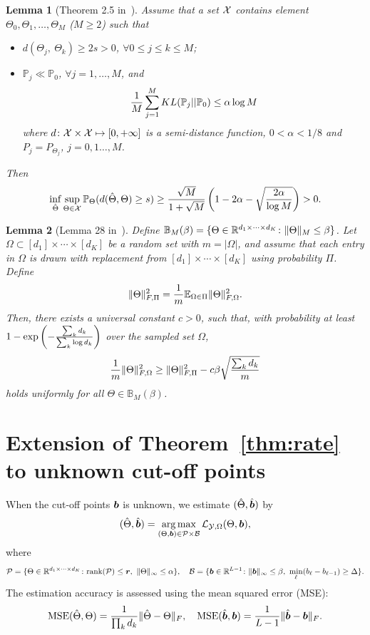 \documentclass[11pt]{article}
\theoremstyle{plain}
\newtheorem{lem}{Lemma}
\theoremstyle{definition}
\begin{document}
\begin{lem}[Theorem 2.5 in~\cite{tsybakov2009introduction}]\label{lem:Tsybakov}
Assume that a set $\mathcal{X}$ contains element $\Theta_0, \Theta_1, \ldots,\Theta_M$ ($M\geq 2$) such that
\begin{itemize}
\item $d(\Theta_j,\ \Theta_k)\geq 2s>0$, $\forall 0\leq j\leq k\leq M$;
\item $\mathbb{P}_j\ll\mathbb{P}_0$, $\forall j=1,\ldots,M$, and
\[
{1\over M}\sum_{j=1}^M KL(\mathbb{P}_j||\mathbb{P}_0)\leq \alpha \log M
\]
where $d\colon \mathcal{X}\times \mathcal{X}\mapsto [0,+\infty]$ is a semi-distance function, $0<\alpha<{1/8}$ and $P_j=P_{\Theta_j}$, $j=0,1\ldots,M$.
\end{itemize}
Then
\[
\inf_{\hat \Theta}\sup_{\Theta\in\mathcal{X}} \mathbb{P}_{\Theta}(d(\hat \Theta, \Theta)\geq s)\geq {\sqrt{M}\over 1+\sqrt{M}}\left(1-2\alpha-\sqrt{2\alpha\over \log M} \right)>0.
\]
\end{lem}

\begin{lem}[Lemma 28 in~\cite{ghadermarzy2019near}]\label{lem:convexity}
Define $\mathbb{B}_{M}(\beta)=\{\Theta\in \mathbb{R}^{d_1\times \cdots \times d_K}\colon \lVert\Theta\rVert_M\leq \beta \}$.  Let $\Omega\subset[d_1]\times\cdots \times [d_K]$ be a random set with $m=|\Omega|$, and assume that each entry in $\Omega$ is drawn with replacement from $[d_1]\times\cdots\times[d_K]$ using probability $\Pi$. Define
\[
\lVert\Theta\rVert_{F,\Pi}^2={1\over m}\mathbb{E}_{\Omega\in\Pi}\lVert\Theta\rVert_{F,\Omega}^2.
\]
Then, there exists a universal constant $c>0$, such that, with probability at least $1-\exp\left(-{\sum_kd_k \over \sum_k \log d_k} \right)$ over the sampled set $\Omega$,
\[
{1\over m}\lVert\Theta\rVert_{F,\Omega}^2 \geq \lVert\Theta\rVert_{F,\Pi}^2-c\beta\sqrt{\sum_k d_k\over m}
\]
holds uniformly for all $\Theta\in\mathbb{B}_M(\beta)$.
\end{lem}


\section{Extension of Theorem~\ref{thm:rate} to unknown cut-off points}



When the cut-off points $\bm{b}$ is unknown, we estimate $(\hat \Theta,\hat {\bm{b}})$ by
\begin{equation}\label{eq:joint}
(\hat \Theta,\hat {\bm{b}})=\operatorname*{arg\,max}_{(\Theta,\bm{b})\in\mathcal{P}\times \mathcal{B}}\mathcal{L}_{\mathcal{Y},\Omega}(\Theta,\bm{b}),
\end{equation}
where 
\[
\tP=\{\Theta\in\mathbb{R}^{d_1\times \cdots\times d_K}\colon \text{rank}(\tP)\leq \mr,\ \mnormSize{}{\Theta}\leq \alpha\}, \quad \tB=\{\mb\in\mathbb{R}^{L-1}\colon \mnormSize{}{\mb}\leq \beta,\ \min_{\ell}(b_\ell-b_{\ell-1}) \geq \Delta\}.
\]
The estimation accuracy is assessed using the mean squared error (MSE):
\[
\text{MSE}(\hat \Theta,\Theta)={1\over \prod_k d_k}\lVert\hat \Theta-\Theta\rVert_F,\quad \text{MSE}(\hat {\bm{b}},\bm{b})={1\over L-1}\lVert\hat {\bm{b}}-\bm{b}\rVert_F.
\]
\end{document}
